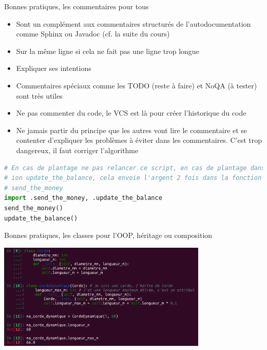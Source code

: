 \documentclass{beamer}
\begin{document}
    \begin{frame}[fragile]{Bonnes pratiques, les commentaires pour tous}


        \begin{itemize}

            \item Sont un complément aux commentaires structurés de l'autodocumentation comme Sphinx ou Javadoc (cf. la suite du cours)
            \item Sur la même ligne si cela ne fait pas une ligne trop longue
            \item Expliquer ses intentions
            \item Commentaires spéciaux comme les TODO (reste à faire) et NoQA (à tester) sont très utiles
            \item Ne pas commenter du code, le VCS est là pour créer l'historique du code
            \item Ne jamais partir du principe que les autres vont lire le commentaire et se contenter d'expliquer les problèmes à éviter dans les commentaires.
            C'est trop dangereux, il faut corriger l'algorithme

        \end{itemize}
        \begin{lstlisting}[language=python]
# En cas de plantage ne pas relancer ce script, en cas de plantage dans la fonct
# ion update_the_balance, cela envoie l'argent 2 fois dans la fonction
# send_the_money
import .send_the_money, .update_the_balance
send_the_money()
update_the_balance()
        \end{lstlisting}
    \end{frame}

    \begin{frame}{Bonnes pratiques, les classes pour l'OOP, héritage ou composition}

        \centering
        \includegraphics[width=10cm]{image/inheritance-or-composition}

    \end{frame}
\end{document}
